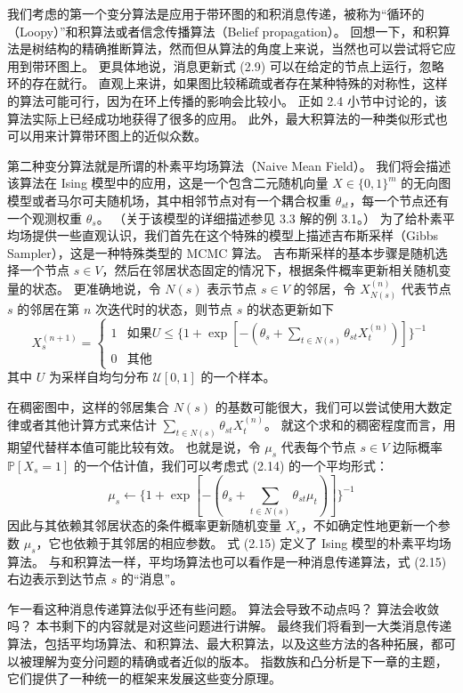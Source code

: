 我们考虑的第一个变分算法是应用于带环图的和积消息传递，被称为“循环的（Loopy）”和积算法或者信念传播算法（Belief propagation）。
回想一下，和积算法是树结构的精确推断算法，然而但从算法的角度上来说，当然也可以尝试将它应用到带环图上。
更具体地说，消息更新式 (2.9) 可以在给定的节点上运行，忽略环的存在就行。
直观上来讲，如果图比较稀疏或者存在某种特殊的对称性，这样的算法可能可行，因为在环上传播的影响会比较小。
正如 2.4 小节中讨论的，该算法实际上已经成功地获得了很多的应用。
此外，最大积算法的一种类似形式也可以用来计算带环图上的近似众数。

第二种变分算法就是所谓的朴素平均场算法（Naive Mean Field）。
我们将会描述该算法在 Ising 模型中的应用，这是一个包含二元随机向量 $X \in \{0, 1\}^m$ 的无向图模型或者马尔可夫随机场，其中相邻节点对有一个耦合权重 $\theta_{st}$，每一个节点还有一个观测权重 $\theta_s$。
（关于该模型的详细描述参见 3.3 解的例 3.1。）
为了给朴素平均场提供一些直观认识，我们首先在这个特殊的模型上描述吉布斯采样（Gibbs Sampler），这是一种特殊类型的 MCMC 算法。
吉布斯采样的基本步骤是随机选择一个节点 $s \in V$，然后在邻居状态固定的情况下，根据条件概率更新相关随机变量的状态。
更准确地说，令 $N(s)$ 表示节点 $s \in V$ 的邻居，令 $X_{N(s)}^{(n)}$ 代表节点 $s$ 的邻居在第 $n$ 次迭代时的状态，则节点 $s$ 的状态更新如下
\begin{equation}
    X_s^{(n+1)} = \begin{cases}
        1 & \text{如果} U \leq \{1 + \exp{[-(\theta_s + \sum_{t \in N(s)}\theta_{st}X_t^{(n)})]}\}^{-1} \\
        0 & \text{其他}
    \end{cases}
\end{equation}
其中 $U$ 为采样自均匀分布 $\mathcal{U}[0, 1]$ 的一个样本。

在稠密图中，这样的邻居集合 $N(s)$ 的基数可能很大，我们可以尝试使用大数定律或者其他计算方式来估计 $\sum_{t \in N(s)}\theta_{st}X_t^{(n)}$。
就这个求和的稠密程度而言，用期望代替样本值可能比较有效。
也就是说，令 $\mu_s$ 代表每个节点 $s \in V$ 边际概率 $\mathbb{P}[X_s = 1]$ 的一个估计值，我们可以考虑式 (2.14) 的一个平均形式：
\begin{equation}
    \mu_s \leftarrow \{1 + \exp{[-(\theta_s + \sum_{t \in N(s)}\theta_{st}\mu_t)]}\}^{-1}
\end{equation}
因此与其依赖其邻居状态的条件概率更新随机变量 $X_s$，不如确定性地更新一个参数 $\mu_s$，它也依赖于其邻居的相应参数。
式 (2.15) 定义了 Ising 模型的朴素平均场算法。
与和积算法一样，平均场算法也可以看作是一种消息传递算法，式 (2.15) 右边表示到达节点 $s$ 的“消息”。

乍一看这种消息传递算法似乎还有些问题。
算法会导致不动点吗？
算法会收敛吗？
本书剩下的内容就是对这些问题进行讲解。
最终我们将看到一大类消息传递算法，包括平均场算法、和积算法、最大积算法，以及这些方法的各种拓展，都可以被理解为变分问题的精确或者近似的版本。
指数族和凸分析是下一章的主题，它们提供了一种统一的框架来发展这些变分原理。



